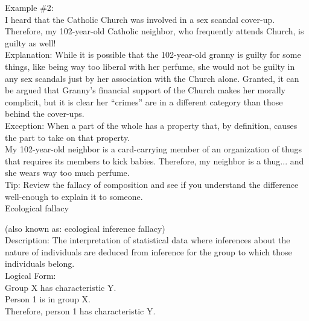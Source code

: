 \documentclass[a4paper,12pt,single,pdftex]{scrartcl}
\begin{document}
    
      Example \#2:
    \\

    
      I heard that the Catholic Church was involved in a sex scandal cover-up.  Therefore, my 102-year-old Catholic neighbor, who frequently attends Church, is guilty as well!
    \\

    
      Explanation: While it is possible that the 102-year-old granny is guilty for some things, like being way too liberal with her perfume, she would not be guilty in any sex scandals just by her association with the Church alone. Granted, it can be argued that Granny’s financial support of the Church makes her morally complicit, but it is clear her “crimes” are in a different category than those behind the cover-ups.
    \\

    
      Exception: When a part of the whole has a property that, by definition, causes the part to take on that property.
    \\

    
      My 102-year-old neighbor is a card-carrying member of an organization of thugs that requires its members to kick babies.  Therefore, my neighbor is a thug... and she wears way too much perfume.
    \\

    
      Tip: Review the fallacy of composition and see if you understand the difference well-enough to explain it to someone.
    \\

  

Ecological fallacy
    
      (also known as: ecological inference fallacy)
    \\

  
    
      Description: The interpretation of statistical data where inferences about the nature of individuals are deduced from inference for the group to which those individuals belong.
    \\

    
      Logical Form:
    \\

    
      Group X has characteristic Y.
    \\

    
      Person 1 is in group X.
    \\

    
      Therefore, person 1 has characteristic Y.
    \\
\end{document}
